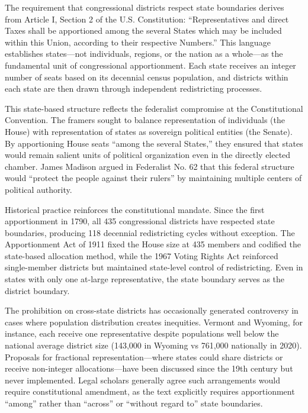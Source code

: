 
The requirement that congressional districts respect state boundaries derives from Article I, Section 2 of the U.S. Constitution: ``Representatives and direct Taxes shall be apportioned among the several States which may be included within this Union, according to their respective Numbers.'' This language establishes states---not individuals, regions, or the nation as a whole---as the fundamental unit of congressional apportionment. Each state receives an integer number of seats based on its decennial census population, and districts within each state are then drawn through independent redistricting processes.

This state-based structure reflects the federalist compromise at the Constitutional Convention. The framers sought to balance representation of individuals (the House) with representation of states as sovereign political entities (the Senate). By apportioning House seats ``among the several States,'' they ensured that states would remain salient units of political organization even in the directly elected chamber. James Madison argued in Federalist No. 62 that this federal structure would ``protect the people against their rulers'' by maintaining multiple centers of political authority.

Historical practice reinforces the constitutional mandate. Since the first apportionment in 1790, all 435 congressional districts have respected state boundaries, producing 118 decennial redistricting cycles without exception. The Apportionment Act of 1911 fixed the House size at 435 members and codified the state-based allocation method, while the 1967 Voting Rights Act reinforced single-member districts but maintained state-level control of redistricting. Even in states with only one at-large representative, the state boundary serves as the district boundary.

The prohibition on cross-state districts has occasionally generated controversy in cases where population distribution creates inequities. Vermont and Wyoming, for instance, each receive one representative despite populations well below the national average district size (143,000 in Wyoming vs 761,000 nationally in 2020). Proposals for fractional representation---where states could share districts or receive non-integer allocations---have been discussed since the 19th century but never implemented. Legal scholars generally agree such arrangements would require constitutional amendment, as the text explicitly requires apportionment ``among'' rather than ``across'' or ``without regard to'' state boundaries.

